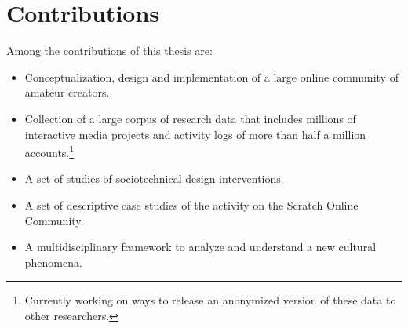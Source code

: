 \chapter{Contributions}

Among the contributions of this thesis are:
\begin{itemize}
\item Conceptualization, design and implementation of a large online community of amateur creators.
\item Collection of a large corpus of research data that includes millions of interactive media projects and activity logs of more than half a million accounts.\footnote{Currently working on ways to release an anonymized version of these data to other researchers.}
\item A set of studies of sociotechnical design interventions.
\item A set of descriptive case studies of the activity on the Scratch Online Community.
\item A multidisciplinary framework to analyze and understand a new cultural phenomena.
\end{itemize}
